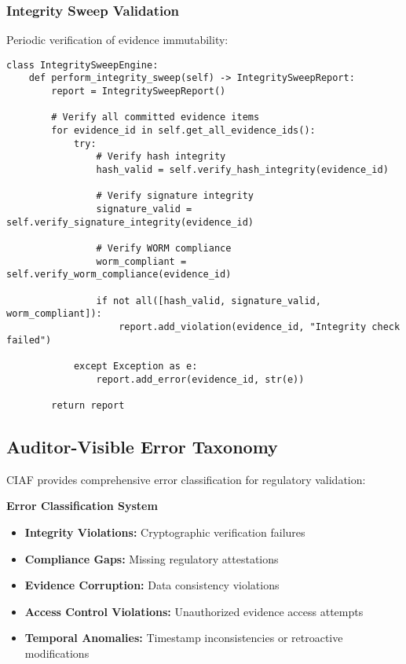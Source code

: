 \documentclass[12pt,a4paper]{article}
\begin{document}
\subsubsection{Integrity Sweep Validation}

Periodic verification of evidence immutability:

\begin{lstlisting}[caption=Integrity Sweep Implementation]
class IntegritySweepEngine:
    def perform_integrity_sweep(self) -> IntegritySweepReport:
        report = IntegritySweepReport()
        
        # Verify all committed evidence items
        for evidence_id in self.get_all_evidence_ids():
            try:
                # Verify hash integrity
                hash_valid = self.verify_hash_integrity(evidence_id)
                
                # Verify signature integrity  
                signature_valid = self.verify_signature_integrity(evidence_id)
                
                # Verify WORM compliance
                worm_compliant = self.verify_worm_compliance(evidence_id)
                
                if not all([hash_valid, signature_valid, worm_compliant]):
                    report.add_violation(evidence_id, "Integrity check failed")
                    
            except Exception as e:
                report.add_error(evidence_id, str(e))
        
        return report
\end{lstlisting}

\subsection{Auditor-Visible Error Taxonomy}

CIAF provides comprehensive error classification for regulatory validation:

\begin{technicalbox}
\textbf{Error Classification System}
\begin{itemize}
\item \textbf{Integrity Violations:} Cryptographic verification failures
\item \textbf{Compliance Gaps:} Missing regulatory attestations
\item \textbf{Evidence Corruption:} Data consistency violations
\item \textbf{Access Control Violations:} Unauthorized evidence access attempts
\item \textbf{Temporal Anomalies:} Timestamp inconsistencies or retroactive modifications
\end{itemize}
\end{technicalbox}
\end{document}
